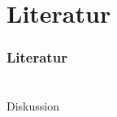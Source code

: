 \section{Literatur}
\begin{frame}[allowframebreaks]
  \frametitle{Literatur}
  \makebibliography
\end{frame}

\section*{}
{

  \begin{frame}
    \centering
    \huge
    Diskussion
  \end{frame}
}
